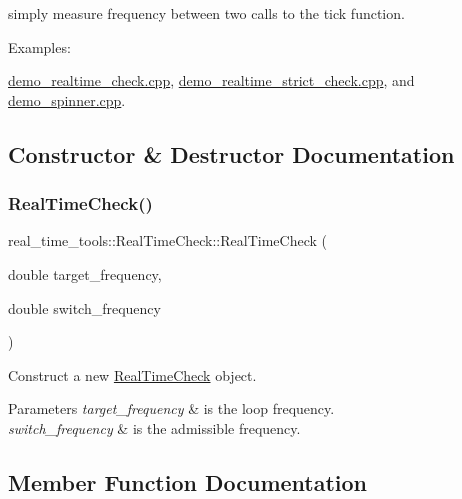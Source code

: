 simply measure frequency between two calls to the tick function. \begin{Desc}
\item[Examples\+: ]\par
\hyperlink{demo_realtime_check_8cpp-example}{demo\+\_\+realtime\+\_\+check.\+cpp}, \hyperlink{demo_realtime_strict_check_8cpp-example}{demo\+\_\+realtime\+\_\+strict\+\_\+check.\+cpp}, and \hyperlink{demo_spinner_8cpp-example}{demo\+\_\+spinner.\+cpp}.\end{Desc}


\subsection{Constructor \& Destructor Documentation}
\mbox{\label{classreal__time__tools_1_1RealTimeCheck_a2f26472092432e628167f89a3a19e27e}} 
\subsubsection{\texorpdfstring{Real\+Time\+Check()}{RealTimeCheck()}}
{\footnotesize\ttfamily real\+\_\+time\+\_\+tools\+::\+Real\+Time\+Check\+::\+Real\+Time\+Check (\begin{DoxyParamCaption}\item[{double}]{target\+\_\+frequency,  }\item[{double}]{switch\+\_\+frequency }\end{DoxyParamCaption})}



Construct a new \hyperlink{classreal__time__tools_1_1RealTimeCheck}{Real\+Time\+Check} object. 


\begin{DoxyParams}{Parameters}
{\em target\+\_\+frequency} & is the loop frequency. \\
\hline
{\em switch\+\_\+frequency} & is the admissible frequency. \\
\hline
\end{DoxyParams}


\subsection{Member Function Documentation}
\mbox{\label{classreal__time__tools_1_1RealTimeCheck_a2b891d59055829fab442ba4c382778e3}} 

